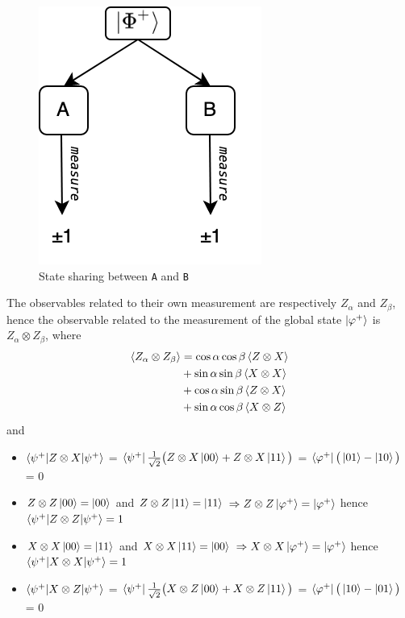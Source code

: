 \documentclass{article}
\begin{document}
\begin{figure}[h]
    \centering
    \includegraphics[scale=0.4]{bell-ineq-sharing-scheme.png}
    \caption{State sharing between \texttt{A} and \texttt{B}}
    \label{fig:sharing-scheme}
\end{figure}
\noindent
The observables related to their own measurement are respectively $Z_\alpha$ and
$Z_\beta$, hence the observable related to the measurement of the global state
$\ket{\varphi^+}$ is $Z_\alpha \otimes Z_\beta$, where
\begin{equation}
    \begin{aligned}
        \braket{Z_\alpha \otimes Z_\beta}
            &= \cos \alpha \cos \beta \braket{Z \otimes X} \\
            &+ \sin \alpha \sin \beta \braket{X \otimes X} \\
            &+ \cos \alpha \sin \beta \braket{Z \otimes X} \\
            &+ \sin \alpha \cos \beta \braket{X \otimes Z}
    \end{aligned}
\end{equation}
and
\begin{itemize}[label=-]
    \item $\braket{\psi^+|Z \otimes X|\psi^+}$ = $\bra{\psi^+}
        \frac{1}{\sqrt2}\big(Z \otimes X\ket{00} + Z \otimes X\ket{11}\big)$ =
        $\bra{\varphi^+}\big(\ket{01}-\ket{10}\big)$ = 0
    \item $Z \otimes Z \ket{00} = \ket{00}$ and $Z \otimes Z \ket{11} =
        \ket{11}$ $\Rightarrow Z \otimes Z \ket{\varphi^+} = \ket{\varphi^+}$ hence
        $\braket{\psi^+|Z \otimes Z|\psi^+} = 1$
    \item $X \otimes X \ket{00} = \ket{11}$ and $X \otimes X \ket{11} =
    \ket{00}$ $\Rightarrow X \otimes X \ket{\varphi^+} = \ket{\varphi^+}$ hence
    $\braket{\psi^+|X \otimes X|\psi^+} = 1$
    \item $\braket{\psi^+|X \otimes Z|\psi^+}$ = $\bra{\psi^+}
    \frac{1}{\sqrt2}\big(X \otimes Z\ket{00} + X \otimes Z\ket{11}\big)$ =
    $\bra{\varphi^+}\big(\ket{10}-\ket{01}\big)$ = 0
\end{itemize}
\end{document}
